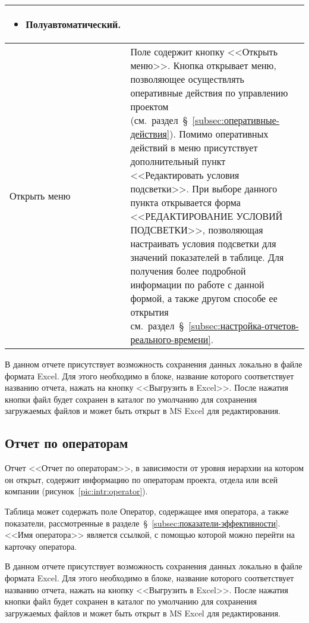 \begin{small}
\begin{longtable}{|p{}|p{}|}
\begin{itemize}
                \item Полуавтоматический.
            \end{itemize} \\
        \hline
        Открыть меню & Поле содержит кнопку <<Открыть меню>>.
        Кнопка открывает меню, позволяющее осуществлять оперативные действия по управлению проектом
        (см.~раздел~\S~\ref{subsec:оперативные-действия}).
        Помимо оперативных действий в меню присутствует дополнительный пункт <<Редактировать условия подсветки>>.
        При выборе данного пункта открывается форма <<РЕДАКТИРОВАНИЕ УСЛОВИЙ ПОДСВЕТКИ>>,
        позволяющая настраивать условия подсветки для значений показателей в таблице.
        Для получения более подробной информации по работе с данной формой,
        а также другом способе ее открытия см.~раздел~\S~\ref{subsec:настройка-отчетов-реального-времени}. \\
\end{longtable}
\end{small}

В данном отчете присутствует возможность сохранения данных локально в файле формата Excel.
Для этого необходимо в блоке, название которого соответствует названию отчета, нажать на кнопку <<Выгрузить в Excel>>.
После нажатия кнопки файл будет сохранен в каталог по умолчанию для сохранения загружаемых файлов и может быть открыт в MS Excel для редактирования.

\subsection{Отчет по операторам}

Отчет <<Отчет по операторам>>, в зависимости от уровня иерархии на котором он открыт,
содержит информацию по операторам проекта, отдела или всей компании (рисунок~\ref{pic:intr:operator}).

Таблица может содержать поле Оператор, содержащее имя оператора, а также показатели, рассмотренные в разделе~\S~\ref{subsec:показатели-эффективности}.
<<Имя оператора>> является ссылкой, с помощью которой можно перейти на карточку оператора.

В данном отчете присутствует возможность сохранения данных локально в файле формата Excel.
Для этого необходимо в блоке, название которого соответствует названию отчета, нажать на кнопку <<Выгрузить в Excel>>.
После нажатия кнопки файл будет сохранен в каталог по умолчанию для сохранения загружаемых файлов и может быть открыт в MS Excel для редактирования.


